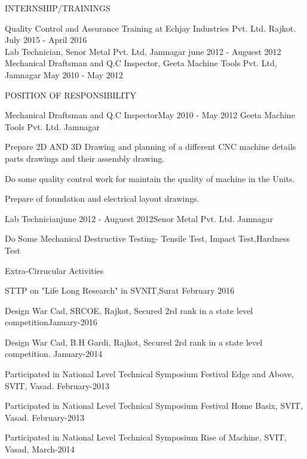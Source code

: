 \documentclass{resume} %
\begin{document}

\begin{rSection}{INTERNSHIP/TRAININGS} \itemsep -3pt  

{Quality Control and Assurance Training at Echjay Industries Pvt. Ltd. Rajkot.} \hfill July 2015 - April 2016 \\ 
{Lab Technician, Senor Metal Pvt. Ltd, Jamnagar} \hfill june 2012 - Auguest 2012\\
{Mechanical Draftsman and Q.C Inspector, Geeta Machine Tools Pvt. Ltd, Jamnagar} \hfill May 2010 - May 2012 \\
\end{rSection} 

\begin{rSection}{POSITION OF RESPONSIBILITY}

\begin{rSubsection}{Mechanical Draftsman and Q.C Inspector}{May 2010 - May 2012} {Geeta Machine Tools Pvt. Ltd. Jamnagar} {} 
\item Prepare 2D AND 3D Drawing and planning of a different CNC machine details
parts drawings and their assembly drawing.
\item Do some quality control work for maintain the quality of machine in the Units.
\item Prepare of foundation and electrical layout drawings.
\end{rSubsection}



\begin{rSubsection}{Lab Technician}{june 2012 - Auguest 2012}{Senor Metal Pvt. Ltd. Jamnagar} {}
 \item Do Some Mechanical Destructive Testing- Tensile Test, Impact Test,Hardness Test
\end{rSubsection}
 
\end{rSection}

\begin{rSection}{Extra-Cirrucular Activities} \itemsep -1pt {}   
\item STTP on "Life Long Research" in SVNIT,Surat \hfill February 2016
\item Design War Cad, SRCOE, Rajkot, Secured 2rd rank in a state level competition\hfill January-2016
\item  Design War Cad, B.H Gardi, Rajkot, Secured 2rd rank in a
state level competition. \hfill January-2014 
\item Participated in National Level Technical Symposium Festival Edge and Above, SVIT, Vasad. \hfill February-2013
\item Participated in National Level Technical Symposium Festival Home Basix, SVIT, Vasad.
 \hfill  February-2013 
\item Participated in National Level Technical Symposium Rise of Machine, SVIT, Vasad,  \hfill March-2014 
 

\end{rSection}
\end{document}
